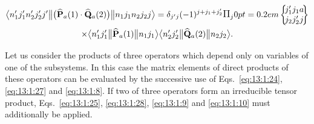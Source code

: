 \begin{multline*}
\braOketred{ n_{1}^{\prime} j_{1}^{\prime} n_{2}^{\prime} j_{2}^{\prime} j^{\prime}}{\bigl(\widehat{\vect{P}}_{a}(1) \cdot \widehat{\vect{Q}}_{a}(2)\bigr)}{n_{1} j_{1} n_{2} j_{2} j}
=\delta_{j^{\prime} j}(-1)^{j+j_{1}+j_{2}^{\prime}} \Fact{j}
\sixj{j_{1}^{\prime}}{j_{1}}{a}{j_{2}}{j_{2}^{\prime}}{j} \\
\times
\braOketred{ n_{1}^{\prime} j_{1}^{\prime}}{\widehat{\vect{P}}_{a}(1)}{ n_{1} j_{1}}
\braOketred{ n_{2}^{\prime} j_{2}^{\prime}}{\widehat{\vect{Q}}_{a}(2)}{ n_{2} j_{2}}.
\end{multline*}

Let us consider the products of three operators which depend only on variables of one of the subsystems. In this case the matrix elements of direct products of these operators can be evaluated by the successive use of Eqs.~\eqref{eq:13:1:24}, \eqref{eq:13:1:27} and \eqref{eq:13:1:8}. If two of three operators form an irreducible tensor product, Eqs.~\eqref{eq:13:1:25}, \eqref{eq:13:1:28}, \eqref{eq:13:1:9} and \eqref{eq:13:1:10} must additionally be applied.

